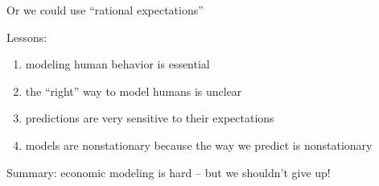 \documentclass[
    xcolor={svgnames,dvipsnames},
    hyperref={colorlinks, citecolor=DeepPink4, linkcolor=DarkRed, urlcolor=DarkBlue}
    ]{beamer}  %
\newcommand{\1}{\mathbbm 1}
\begin{document}
\begin{frame}

    Or we could use ``rational expectations''
    
    \begin{figure}
        \centering
    \end{figure}

\end{frame}


\begin{frame}

    Lessons:
    \begin{enumerate}
        \item modeling human behavior is essential
            \vspace{1em}
        \item the ``right'' way to model humans is unclear
            \vspace{1em}
        \item predictions are very sensitive to their expectations
            \vspace{1em}
        \item models are nonstationary because the way we predict is
            nonstationary 
    \end{enumerate}
    
        \vspace{1em}
        \vspace{1em}
    Summary: economic modeling is hard -- but we shouldn't give up!

\end{frame}
\end{document}
